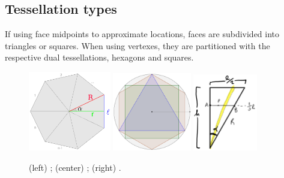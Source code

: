 \documentclass{article}
\begin{document}
\subsection{Tessellation types}

If using face midpoints to approximate locations, faces are subdivided into triangles or squares. When using vertexes, they are partitioned with the respective dual tessellations, hexagons and squares.

\begin{figure}[tbp]
    \centering
    \includegraphics[width=0.32\textwidth]{polygon.png}
    \hspace{1em}
    \includegraphics[width=0.305\textwidth]{areas.png}
    \hspace{1em}
    \includegraphics[width=0.25\textwidth]{meandist.png}
    \caption{(left) ; (center) ; (right) .}
    \label{fig:polygon}
\end{figure}
\end{document}
